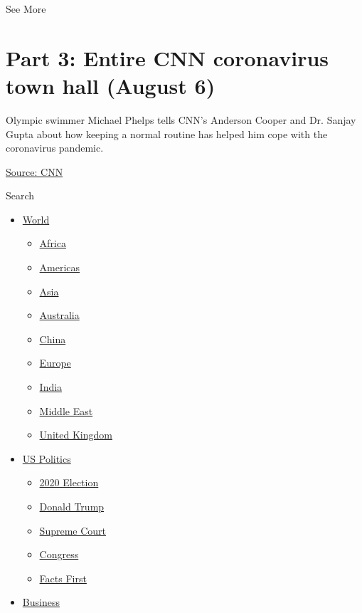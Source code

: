 See More

\hypertarget{part-3-entire-cnn-coronavirus-town-hall-august-6-2}{%
\section{Part 3: Entire CNN coronavirus town hall (August
6)}\label{part-3-entire-cnn-coronavirus-town-hall-august-6-2}}

Olympic swimmer Michael Phelps tells CNN's Anderson Cooper and Dr.
Sanjay Gupta about how keeping a normal routine has helped him cope with
the coronavirus pandemic.

\href{https://www.cnn.com/}{Source: CNN}

Search

\begin{itemize}
\tightlist
\item
  \href{/world}{World}

  \begin{itemize}
  \tightlist
  \item
    \href{/africa}{Africa}
  \item
    \href{/americas}{Americas}
  \item
    \href{/asia}{Asia}
  \item
    \href{/australia}{Australia}
  \item
    \href{/china}{China}
  \item
    \href{/europe}{Europe}
  \item
    \href{/india}{India}
  \item
    \href{/middle-east}{Middle East}
  \item
    \href{/uk}{United Kingdom}
  \end{itemize}
\item
  \href{/politics}{US Politics}

  \begin{itemize}
  \tightlist
  \item
    \href{/election/2020}{2020 Election}
  \item
    \href{/specials/politics/president-donald-trump-45}{Donald Trump}
  \item
    \href{/specials/politics/supreme-court-nine}{Supreme Court}
  \item
    \href{/specials/politics/congress}{Congress}
  \item
    \href{/specials/politics/fact-check-politics}{Facts First}
  \end{itemize}
\item
  \href{/business}{Business}


\end{itemize}
